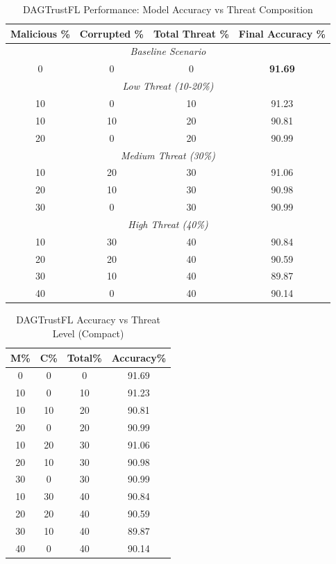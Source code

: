 \begin{table}[htbp]
\centering
\caption{DAGTrustFL Performance: Model Accuracy vs Threat Composition}
\label{tab:dagtrust_grouped}
\begin{tabular}{cccc}
\toprule
\textbf{Malicious \%} & \textbf{Corrupted \%} & \textbf{Total Threat \%} & \textbf{Final Accuracy \%} \\
\midrule
\multicolumn{4}{c}{\textit{Baseline Scenario}} \\
0 & 0 & 0 & \textbf{91.69} \\
\midrule
\multicolumn{4}{c}{\textit{Low Threat (10-20\%)}} \\
10 & 0 & 10 & 91.23 \\
10 & 10 & 20 & 90.81 \\
20 & 0 & 20 & 90.99 \\
\midrule
\multicolumn{4}{c}{\textit{Medium Threat (30\%)}} \\
10 & 20 & 30 & 91.06 \\
20 & 10 & 30 & 90.98 \\
30 & 0 & 30 & 90.99 \\
\midrule
\multicolumn{4}{c}{\textit{High Threat (40\%)}} \\
10 & 30 & 40 & 90.84 \\
20 & 20 & 40 & 90.59 \\
30 & 10 & 40 & 89.87 \\
40 & 0 & 40 & 90.14 \\
\bottomrule
\end{tabular}
\end{table}

\begin{table}[htbp]
\centering
\caption{DAGTrustFL Accuracy vs Threat Level (Compact)}
\label{tab:dagtrust_compact}
\small
\begin{tabular}{|c|c|c|c|}
\hline
\textbf{M\%} & \textbf{C\%} & \textbf{Total\%} & \textbf{Accuracy\%} \\
\hline
0 & 0 & 0 & 91.69 \\
\hline
10 & 0 & 10 & 91.23 \\
\hline
10 & 10 & 20 & 90.81 \\
\hline
20 & 0 & 20 & 90.99 \\
\hline
10 & 20 & 30 & 91.06 \\
\hline
20 & 10 & 30 & 90.98 \\
\hline
30 & 0 & 30 & 90.99 \\
\hline
10 & 30 & 40 & 90.84 \\
\hline
20 & 20 & 40 & 90.59 \\
\hline
30 & 10 & 40 & 89.87 \\
\hline
40 & 0 & 40 & 90.14 \\
\hline
\end{tabular}
\end{table}

